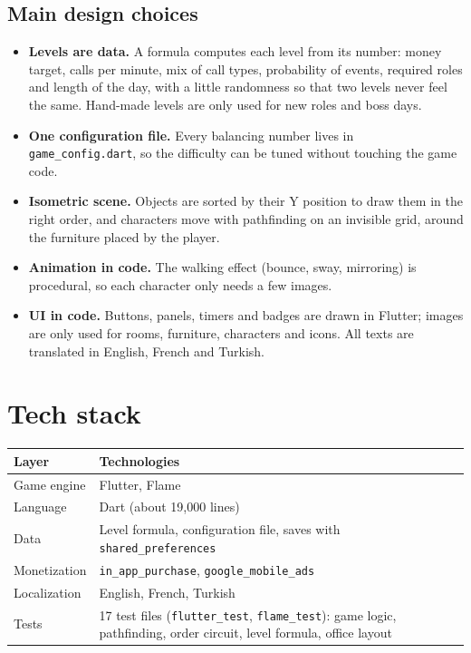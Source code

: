 \documentclass[a4paper,11pt]{article}
\newcommand{\code}[1]{\texttt{#1}}
\begin{document}
\subsection{Main design choices}
\begin{itemize}
  \item \textbf{Levels are data.} A formula computes each level from its number: money target, calls per minute, mix of call types, probability of events, required roles and length of the day, with a little randomness so that two levels never feel the same. Hand-made levels are only used for new roles and boss days.
  \item \textbf{One configuration file.} Every balancing number lives in \code{game\_config.dart}, so the difficulty can be tuned without touching the game code.
  \item \textbf{Isometric scene.} Objects are sorted by their Y position to draw them in the right order, and characters move with pathfinding on an invisible grid, around the furniture placed by the player.
  \item \textbf{Animation in code.} The walking effect (bounce, sway, mirroring) is procedural, so each character only needs a few images.
  \item \textbf{UI in code.} Buttons, panels, timers and badges are drawn in Flutter; images are only used for rooms, furniture, characters and icons. All texts are translated in English, French and Turkish.
\end{itemize}

\section{Tech stack}

\begin{table}[H]
\centering
\begin{tabularx}{\textwidth}{@{}lX@{}}
\toprule
\textbf{Layer} & \textbf{Technologies} \\
\midrule
Game engine & Flutter, Flame \\
Language & Dart (about 19,000 lines) \\
Data & Level formula, configuration file, saves with \code{shared\_preferences} \\
Monetization & \code{in\_app\_purchase}, \code{google\_mobile\_ads} \\
Localization & English, French, Turkish \\
Tests & 17 test files (\code{flutter\_test}, \code{flame\_test}): game logic, pathfinding, order circuit, level formula, office layout \\
\bottomrule
\end{tabularx}
\end{table}
\end{document}
